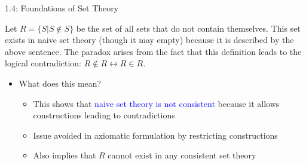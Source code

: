 \documentclass[10pt,english]{beamer}
\begin{document}
\begin{frame}{1.4: Foundations of Set Theory}

\begin{example}
Let $R = \{S|S\notin S\}$ be the set of all sets that do not contain themselves.
This set exists in naive set theory (though it may empty) because it is described by the above sentence.
The paradox arises from the fact that this definition leads to the logical contradiction: $R\notin R \leftrightarrow R\in R$.
\end{example}

\vspace{5mm}

\begin{itemize}
\setlength\itemsep{3mm}
\item<1-> What does this mean? \vspace{1mm}
\begin{itemize} 
  \setlength\itemsep{1.5mm}
  \item This shows that \textcolor{blue}{naive set theory is not consistent} because it allows constructions leading to contradictions
  \item Issue avoided in axiomatic formulation by restricting constructions
  \item Also implies that $R$ cannot exist in any consistent set theory
\end{itemize}

\end{itemize}
\end{frame}
\end{document}
